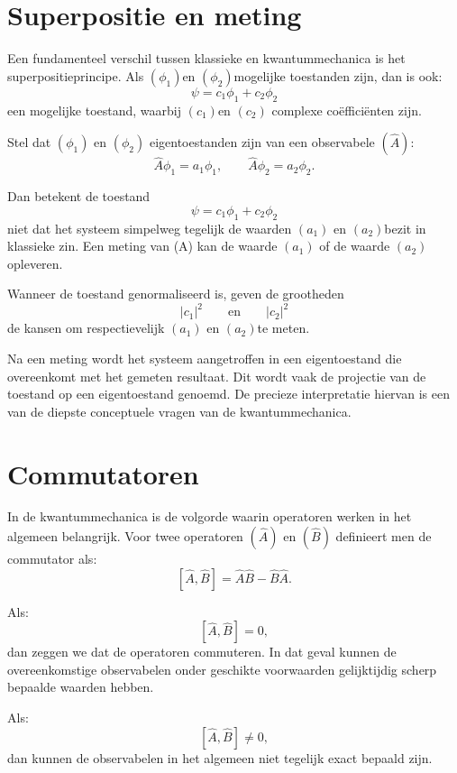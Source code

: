\documentclass{report} %
\begin{document}
    \section{Superpositie en meting}

    Een fundamenteel verschil tussen klassieke en kwantummechanica is het superpositieprincipe. Als $(\phi_1) $en $(\phi_2) $mogelijke toestanden zijn, dan is ook:
    \[
        \psi=c_1\phi_1+c_2\phi_2
    \]
    een mogelijke toestand, waarbij $(c_1) $en $(c_2)$ complexe coëfficiënten zijn.

    Stel dat $(\phi_1)$ en $(\phi_2)$ eigentoestanden zijn van een observabele $(\hat{A})$:
    \[
        \hat{A}\phi_1=a_1\phi_1,
        \qquad
        \hat{A}\phi_2=a_2\phi_2.
    \]

    Dan betekent de toestand
    \[
        \psi=c_1\phi_1+c_2\phi_2
    \]
    niet dat het systeem simpelweg tegelijk de waarden $(a_1)$ en $(a_2) $bezit in klassieke zin. Een meting van (A) kan de waarde $(a_1)$ of de waarde $(a_2)$ opleveren.

    Wanneer de toestand genormaliseerd is, geven de grootheden
    \[
        |c_1|^2
        \qquad \text{en} \qquad
        |c_2|^2
    \]
    de kansen om respectievelijk $(a_1)$ en $(a_2) $te meten.

    Na een meting wordt het systeem aangetroffen in een eigentoestand die overeenkomt met het gemeten resultaat. Dit wordt vaak de projectie van de toestand op een eigentoestand genoemd. De precieze interpretatie hiervan is een van de diepste conceptuele vragen van de kwantummechanica.


    \section{Commutatoren}

    In de kwantummechanica is de volgorde waarin operatoren werken in het algemeen belangrijk. Voor twee operatoren $(\hat{A})$ en $(\hat{B})$ definieert men de commutator als:
    \[
        [\hat{A},\hat{B}]
        =
        \hat{A}\hat{B}
        -
        \hat{B}\hat{A}.
    \]

    Als:
    \[
        [\hat{A},\hat{B}]=0,
    \]
    dan zeggen we dat de operatoren commuteren. In dat geval kunnen de overeenkomstige observabelen onder geschikte voorwaarden gelijktijdig scherp bepaalde waarden hebben.

    Als:
    \[
        [\hat{A},\hat{B}]\neq 0,
    \]
    dan kunnen de observabelen in het algemeen niet tegelijk exact bepaald zijn.
\end{document}
